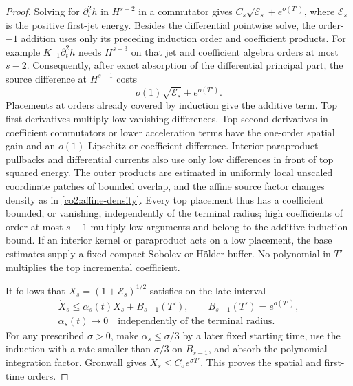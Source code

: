 \begin{proof}
Solving for $\partial_t^2h$ in $H^{s-2}$ in a commutator gives
$C_s\sqrt{\mathcal E_s}+e^{o(T')}$, where $\mathcal E_s$ is the positive
first-jet energy.  Besides the differential pointwise solve, the order-$-1$
addition uses only its preceding induction order and coefficient products.
For example $K_{-1}\partial_t^2h$ needs $H^{s-3}$ on that jet and
coefficient algebra orders at most $s-2$.  Consequently, after exact
absorption of the differential principal part, the source difference at
$H^{s-1}$ costs
\[
 o(1)\sqrt{\mathcal E_s}+e^{o(T')}.
\]
Placements at orders already covered by induction give the additive term.
Top first derivatives multiply low vanishing differences.  Top second
derivatives in coefficient commutators or lower acceleration terms have the
one-order spatial gain and an $o(1)$ Lipschitz or coefficient difference.
Interior paraproduct pullbacks and differential currents also use only low
differences in front of top squared energy.  The outer products are estimated
in uniformly local unscaled coordinate patches of bounded overlap, and the
affine source factor changes density as in \eqref{co2:affine-density}.
Every top placement thus has a coefficient bounded, or vanishing, independently
of the terminal radius; high coefficients of order at most $s-1$ multiply
low arguments and belong to the additive induction bound.  If an interior
kernel or paraproduct acts on a low placement, the base estimates supply a
fixed compact Sobolev or H\"older buffer.  No polynomial in $T'$ multiplies
the top incremental coefficient.

It follows that $X_s=(1+\mathcal E_s)^{1/2}$ satisfies on the late interval
\begin{equation}\label{co2:higher-gronwall}
 \begin{gathered}
 \dot X_s\le\alpha_s(t)X_s+B_{s-1}(T'),
       \qquad B_{s-1}(T')=e^{o(T')},\\
 \alpha_s(t)\longrightarrow0
       \quad\text{independently of the terminal radius}.
 \end{gathered}
\end{equation}
For any prescribed $\sigma>0$, make $\alpha_s\le\sigma/3$ by a later
fixed starting time, use the induction with a rate smaller than $\sigma/3$
on $B_{s-1}$, and absorb the polynomial integration factor.  Gronwall gives
$X_s\le C_\sigma e^{\sigma T'}$.  This proves the spatial and first-time
orders.


\end{proof}
